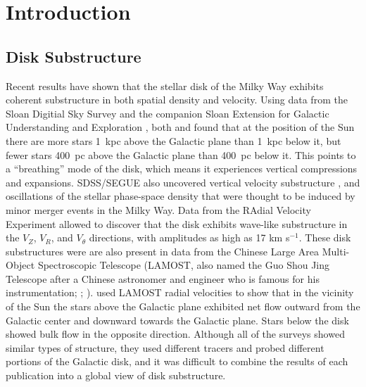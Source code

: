 \documentclass[11pt,preprint]{aastex6}
\begin{document}
\section{Introduction}
\subsection{Disk Substructure}

Recent results have shown that the stellar disk of the Milky Way exhibits coherent substructure in both spatial density and velocity.  Using data from the Sloan Digitial Sky Survey \citep[SDSS;][]{2000AJ....120.1579Y} and the companion Sloan Extension for Galactic Understanding and Exploration \citep[SEGUE;][]{2009AJ....137.4377Y}, both \citet{Widrow2012} and \citet{Yanny2013} found that at the position of the Sun there are more stars 1~kpc above the Galactic plane than 1~kpc below it, but fewer stars 400~pc above the Galactic plane than 400~pc below it.  This points to a ``breathing'' mode of the disk, which means it experiences vertical compressions and expansions.  SDSS/SEGUE also uncovered vertical velocity substructure \citep{Widrow2012}, and oscillations of the stellar phase-space density \citep{Gomez2012} that were thought to be induced by minor merger events in the Milky Way.  Data from the RAdial Velocity Experiment \citep[RAVE;][]{2006AJ....132.1645S} allowed \citet{Williams2013} to discover that the disk exhibits wave-like substructure in the $V_Z$, $V_R$, and $V_\theta$ directions, with amplitudes as high as 17 km s$^{-1}$.  These disk substructures were are also present in data from the Chinese Large Area Multi-Object Spectroscopic Telescope (LAMOST, also named the Guo Shou Jing Telescope after a Chinese astronomer and engineer who is famous for his instrumentation; \citealt{Cui2012}; \citealt{Su2004}).  \citet{Carlin2013} used LAMOST radial velocities to show that in the vicinity of the Sun the stars above the Galactic plane exhibited net flow outward from the Galactic center and downward towards the Galactic plane.  Stars below the disk showed bulk flow in the opposite direction.  Although all of the surveys showed similar types of structure, they used different tracers and probed different portions of the Galactic disk, and it was difficult to combine the results of each publication into a global view of disk substructure.
\end{document}
